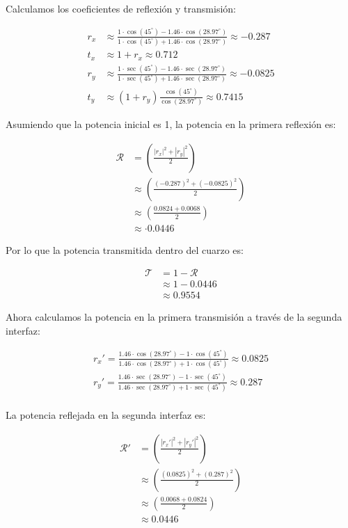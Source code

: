 \documentclass[11pt]{article}
\begin{document}
Calculamos los coeficientes de reflexión y transmisión:

\begin{align*}
    r_x &\approx \frac{1 \cdot \cos(45^\circ) - 1.46 \cdot \cos(28.97^\circ)}{1 \cdot \cos(45^\circ) + 1.46 \cdot \cos(28.97^\circ)} \approx -0.287 \\
    t_x &\approx 1 + r_x \approx 0.712 \\
    r_y &\approx \frac{1 \cdot \sec(45^\circ) - 1.46 \cdot \sec(28.97^\circ)}{1 \cdot \sec(45^\circ) + 1.46 \cdot \sec(28.97^\circ)} \approx -0.0825 \\
    t_y &\approx (1 + r_y) \frac{\cos(45^\circ)}{\cos(28.97^\circ)} \approx 0.7415
\end{align*}

Asumiendo que la potencia inicial es 1, la potencia en la primera reflexión es:

\begin{align*}
    \mathcal{R}  &= \left(\frac{|r_x|^2 + |r_y|^2}{2}\right) \\
    &\approx \left(\frac{(-0.287)^2 + (-0.0825)^2}{2}\right) \\
    &\approx \left(\frac{0.0824 + 0.0068}{2}\right) \\
    &\approx \cdot 0.0446
\end{align*}

Por lo que la potencia transmitida dentro del cuarzo es:

\begin{align*}
    \mathcal{T}  &= 1 - \mathcal{R}  \\
    &\approx 1 - 0.0446 \\
    &\approx 0.9554
\end{align*}

Ahora calculamos la potencia en la primera transmisión a través de la segunda interfaz:

\begin{align*}
    r_x' = \frac{1.46 \cdot \cos(28.97^\circ) - 1 \cdot \cos(45^\circ)}{1.46 \cdot \cos(28.97^\circ) + 1 \cdot \cos(45^\circ)} \approx 0.0825 \\
    r_y' = \frac{1.46 \cdot \sec(28.97^\circ) - 1 \cdot \sec(45^\circ)}{1.46 \cdot \sec(28.97^\circ) + 1 \cdot \sec(45^\circ)} \approx 0.287 \\
\end{align*}

La potencia reflejada en la segunda interfaz es:

\begin{align*}
    \mathcal{R}' &= \left(\frac{|r_x'|^2 + |r_y'|^2}{2}\right) \\
    &\approx \left(\frac{(0.0825)^2 + (0.287)^2}{2}\right) \\
    &\approx \left(\frac{0.0068 + 0.0824}{2}\right) \\
    &\approx 0.0446
\end{align*}
\end{document}
